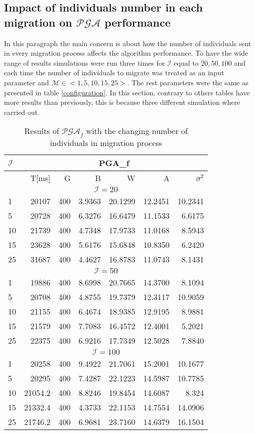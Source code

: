 \subsection{Impact of individuals number in each migration on $\mathcal{PGA}$ performance}
\label{cha:both}
In this paragraph the main concern is about how the number of individuals sent in
every migration process affects the algorithm performance. To have the wide
range of results simulations were run three times for $\mathcal{I}$ equal
to $20, 50, 100$ and each time the number of individuals to migrate was treated as an
input parameter and $\mathcal{M} \in <1, 5, 10, 15, 25>$. The rest parameters
were the same as presented in table \ref{configuration}. In this section,
contrary to others tables have more results than previously, this is because
three different simulation where carried out.
\begin{table}[!htpb]
	\label{migNum1}
	\caption{Results of $\mathcal{PGA}_f$ with the changing
	number of individuals in migration process}
	\centering
	\begin{tabular}{l||r|r|r|r|r|r|}
        $\mathcal{I}$ & \multicolumn{6}{c|}{PGA\_f} \\ \hline
		          &T[ms]&G& B&W&A&$\sigma^2$ \\ \hline
				  \multicolumn{7}{c|}{$\mathcal{I}=20$}\\ \hline
1&20107&400&3.9363&20.1299&12.2451&10.2341\\ \hline
5&20728&400&6.3276&16.6479&11.1533&6.6175\\ \hline
10&21739&400&4.7348&17.9733&11.0168&8.5943\\ \hline
15&23628&400&5.6176&15.6848&10.8350&6.2420\\ \hline
25&31687&400&4.4627&16.8783&11.0743&8.1431\\ \hline
				  \multicolumn{7}{c|}{$\mathcal{I}=50$}\\ \hline
1&19886&400&8.6998&20.7665&14.3700&8.1094\\ \hline
5&20708&400&4.8755&19.7379&12.3117&10.9059\\ \hline
10&21155&400&6.4674&18.9385&12.9195&8.9881\\ \hline
15&21579&400&7.7083&16.4572&12.4001&5.2021\\ \hline
25&22375&400&6.9216&17.7349&12.5028&7.8840\\ \hline
				  \multicolumn{7}{c|}{$\mathcal{I}=100$}\\ \hline
1&20258&400&9.4922&21.7061&15.2001&10.1677\\ \hline
5&20295&400&7.4287&22.1223&14.5987&10.7785\\ \hline
10&21054.2&400&8.8246&19.8454&14.6087&8.324\\ \hline
15&21332.4&400&4.3733&22.1153&14.7554&14.0906\\ \hline
25&21746.2&400&6.9681&23.7160&14.6379&16.1504\\ \hline
	\end{tabular}
\end{table}

